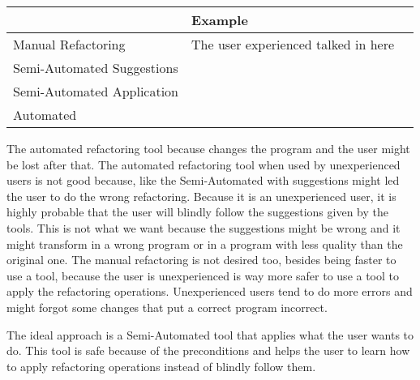 

\begin{table}[h]
\begin{tabular}{l|l|l|}
\cline{2-3}
                                                 & Example                             &  \\ \hline
\multicolumn{1}{|l|}{Manual Refactoring}         & The user experienced talked in here &  \\ \hline
\multicolumn{1}{|l|}{Semi-Automated Suggestions}  &                                     &  \\ \hline
\multicolumn{1}{|l|}{Semi-Automated Application} &                                     &  \\ \hline
\multicolumn{1}{|l|}{Automated}                  &                                     &  \\ \hline
\end{tabular}
\end{table}



The automated refactoring tool because changes the program and the user might be lost after that. %
The automated refactoring tool when used by unexperienced users is not good because, like the Semi-Automated with suggestions might led the user to do the wrong refactoring.
Because it is an unexperienced user, it is highly probable that the user will blindly follow the suggestions given by the tools. 
This is not what we want because the suggestions might be wrong and it might transform in a wrong program or in a program with less quality than the original one.
The manual refactoring is not desired too, besides being faster to use a tool, because the user is unexperienced is way more safer to use a tool to apply the refactoring operations. 
Unexperienced users tend to do more errors and might forgot some changes that put a correct program incorrect.

The ideal approach is a Semi-Automated tool that applies what the user wants to do. 
This tool is safe because of the preconditions and helps the user to learn how to apply refactoring operations instead of blindly follow them.

